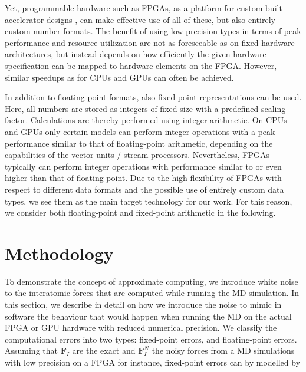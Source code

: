 \documentclass[format=acmsmall,review,timestamp,urlbreakonhyphens]{acmart}
\begin{document}
Yet, programmable hardware such as FPGAs, as a platform for custom-built accelerator designs \cite{Strzodka2006, KenterVector, KenterPragma}, can make effective use of all of these, but also entirely custom number formats. The benefit of using low-precision types in terms of peak performance and resource utilization are not as foreseeable as on fixed hardware architectures, but instead depends on how efficiently the given hardware specification can be mapped to hardware elements on the FPGA. However, similar speedups as for CPUs and GPUs can often be achieved.

In addition to floating-point formats, also fixed-point representations can be used. Here, all numbers are stored as integers of fixed size with a
predefined scaling factor. Calculations are thereby performed using integer arithmetic. On CPUs and GPUs only certain models can perform integer operations with a peak performance similar to that of floating-point arithmetic, depending on the capabilities of the vector units / stream processors. Nevertheless, FPGAs typically can perform integer operations with performance similar to or even higher than that of floating-point. Due to the high flexibility of FPGAs with respect to different data formats and the possible use of entirely custom data types, we see them as the main target technology for our work. For this reason, we consider both floating-point and fixed-point arithmetic in the following.



\section{Methodology}
\label{sec:methodology}
To demonstrate the concept of approximate computing, we introduce white noise to the interatomic forces that are computed while running the MD simulation. In this section, we describe in detail on how we introduce the noise to mimic in software the behaviour that would happen when running the MD on the actual FPGA or GPU hardware with reduced numerical precision. We classify the computational errors into two types: fixed-point errors, and floating-point errors. Assuming that $\textbf{F}_{I}$ are the exact and $\textbf{F}_{I}^{N}$ the noisy forces from a MD simulations with low precision on a FPGA for instance, fixed-point errors can by modelled by
\end{document}
